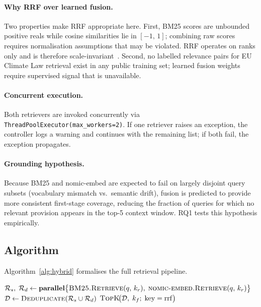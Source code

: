 \documentclass[sigconf,screen]{acmart}
\newcommand{\nomicshort}{nomic-embed\xspace}
\newcommand{\rrf}{RRF\xspace}
\begin{document}
\paragraph{Why RRF over learned fusion.}
Two properties make \rrf appropriate here.  First, BM25 scores are
unbounded positive reals while cosine similarities lie in
$[-1,\,1]$; combining raw scores requires normalisation assumptions
that may be violated.  \rrf operates on ranks only and is therefore
scale-invariant~\cite{cormack2009rrf}.  Second, no labelled
relevance pairs for EU Climate Law retrieval exist in any public
training set; learned fusion weights require supervised signal that
is unavailable.

\paragraph{Concurrent execution.}
Both retrievers are invoked concurrently via
\texttt{ThreadPoolExecutor(max\_workers=2)}.  If one retriever raises
an exception, the controller logs a warning and continues with the
remaining list; if both fail, the exception propagates.

\paragraph{Grounding hypothesis.}
Because BM25 and \nomicshort are expected to fail on largely
disjoint query subsets (vocabulary mismatch vs.\ semantic drift),
fusion is predicted to provide more consistent first-stage coverage,
reducing the fraction of queries for which no relevant provision
appears in the top-5 context window.  RQ1 tests this hypothesis
empirically.

\subsection{Algorithm}
\label{sec:algo}

Algorithm~\ref{alg:hybrid} formalises the full retrieval pipeline.

\begin{algorithm}[ht]
\DontPrintSemicolon
\SetAlgoLined
\caption{Hybrid Sparse-Dense Retrieval Pipeline}
\label{alg:hybrid}
\BlankLine
{}
$\mathcal{R}_s,\;\mathcal{R}_d \leftarrow
  \textbf{parallel}\bigl\{
    \textsc{BM25.Retrieve}(q,\,k_r),\;
    \textsc{nomic\text{-}embed.Retrieve}(q,\,k_r)
  \bigr\}$\;
\BlankLine
{}
$\mathcal{D} \leftarrow
  \textsc{Deduplicate}(\mathcal{R}_s \cup \mathcal{R}_d)$
\BlankLine
{}
\Return $\textsc{TopK}\!\bigl(\mathcal{D},\;k_f;\;
  \mathrm{key}=\mathrm{rrf}\bigr)$\;
\end{algorithm}
\end{document}
